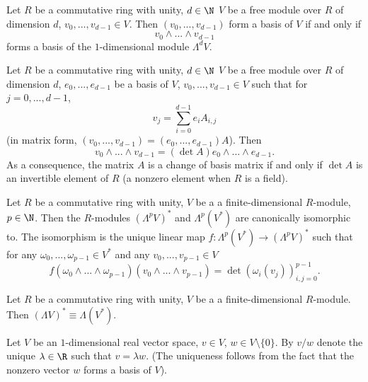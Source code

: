 \begin{proposition}
  Let
    $R$ be a commutative ring with unity,
    $d \in \N$
    $V$ be a free module over $R$ of dimension $d$,
    $v_0, ..., v_{d - 1} \in V$.
  Then $(v_0, ..., v_{d - 1})$ form a basis of $V$
  if and only if
  \begin{equation}
    v_0 \wedge ... \wedge v_{d - 1}
  \end{equation}
  forms a basis of the $1$-dimensional module $\Lambda^d V$.
\end{proposition}
\begin{proposition}
  Let
    $R$ be a commutative ring with unity,
    $d \in \N$
    $V$ be a free module over $R$ of dimension $d$,
    $e_0, ..., e_{d - 1}$ be a basis of $V$,
    $v_0, ..., v_{d - 1} \in V$ such that for $j = 0, ..., d - 1$,
  \begin{equation}
    v_j = \sum_{i = 0}^{d - 1} e_i A_{i, j}
  \end{equation}
  (in matrix form, $(v_0, ..., v_{d - 1}) = (e_0, ..., e_{d - 1}) A$).
  Then
  \begin{equation}
    v_0 \wedge ... \wedge v_{d - 1} = (\det A) e_0 \wedge ... \wedge e_{d - 1}.
  \end{equation}
  As a consequence, the matrix $A$ is a change of basis matrix if and only if
  $\det A$ is an invertible element of $R$
  (a nonzero element when $R$ is a field).
\end{proposition}
\begin{proposition}
  Let
    $R$ be a commutative ring with unity,
    $V$ be a a finite-dimensional $R$-module,
    $p \in \N$.
  Then the $R$-modules $(\Lambda^p V)^*$ and $\Lambda^p (V^*)$
  are canonically isomorphic to.
  The isomorphism is the unique linear map
  $f \colon \Lambda^p (V^*) \to (\Lambda^p V)^*$ such that
  for any $\omega_0, ..., \omega_{p - 1} \in V^*$
  and any $v_0, ..., v_{p - 1} \in V$
  \begin{equation}
    f(\omega_0 \wedge ... \wedge \omega_{p - 1})
    (v_0 \wedge ... \wedge v_{p - 1})
    = \det (\omega_i(v_j))_{i, j = 0}^{p - 1}.
  \end{equation}
\end{proposition}
\begin{corollary}
  Let
    $R$ be a commutative ring with unity,
    $V$ be a a finite-dimensional $R$-module.
  Then $(\Lambda V)^* \equiv \Lambda (V^*)$.
\end{corollary}
\begin{notation}
  Let
    $V$ be an $1$-dimensional real vector space,
    $v \in V$,
    $w \in V \setminus \{0\}$.
  By $v / w$ denote the unique $\lambda \in \R$ such that $v = \lambda w$.
  (The uniqueness follows from the fact that the nonzero vector $w$ forms a
  basis of $V$).
\end{notation}
